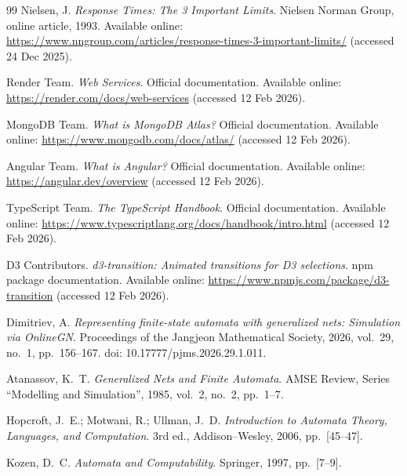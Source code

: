 \begin{thebibliography}{99}
Nielsen, J.
\newblock \emph{Response Times: The 3 Important Limits}.
\newblock Nielsen Norman Group, online article, 1993.
\newblock Available online: \url{https://www.nngroup.com/articles/response-times-3-important-limits/} (accessed 24 Dec 2025).

 Render Team.
\newblock \emph{Web Services}.
\newblock Official documentation.
\newblock Available online: \url{https://render.com/docs/web-services} (accessed 12 Feb 2026).

 MongoDB Team.
\newblock \emph{What is MongoDB Atlas?}
\newblock Official documentation.
\newblock Available online: \url{https://www.mongodb.com/docs/atlas/} (accessed 12 Feb 2026).

Angular Team.
\newblock \emph{What is Angular?}
\newblock Official documentation.
\newblock Available online: \url{https://angular.dev/overview} (accessed 12 Feb 2026).

TypeScript Team.
\newblock \emph{The TypeScript Handbook}.
\newblock Official documentation.
\newblock Available online: \url{https://www.typescriptlang.org/docs/handbook/intro.html} (accessed 12 Feb 2026).

D3 Contributors.
\newblock \emph{d3-transition: Animated transitions for D3 selections}.
\newblock npm package documentation.
\newblock Available online: \url{https://www.npmjs.com/package/d3-transition} (accessed 12 Feb 2026).

Dimitriev, A.
\newblock \emph{Representing finite-state automata with generalized nets: Simulation via OnlineGN}.
\newblock Proceedings of the Jangjeon Mathematical Society, 2026, vol.~29, no.~1, pp.~156--167.
\newblock doi: 10.17777/pjms.2026.29.1.011.

Atanassov, K.~T.
\newblock \emph{Generalized Nets and Finite Automata}.
\newblock AMSE Review, Series ``Modelling and Simulation'', 1985, vol.~2, no.~2, pp.~1--7.

Hopcroft, J.~E.; Motwani, R.; Ullman, J.~D.
\newblock \emph{Introduction to Automata Theory, Languages, and Computation}.
\newblock 3rd ed., Addison--Wesley, 2006, pp.~[45--47].

Kozen, D.~C.
\newblock \emph{Automata and Computability}.
\newblock Springer, 1997, pp.~[7--9].


\end{thebibliography}
